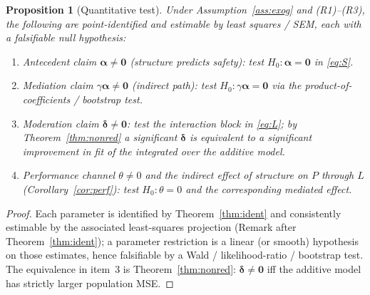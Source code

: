 \documentclass{amsart}
\theoremstyle{definition}
\theoremstyle{plain}
\newtheorem{proposition}{Proposition}
\begin{document}
\begin{proposition}[Quantitative test]\label{prop:quant}
Under Assumption~\ref{ass:exog} and (R1)--(R3), the following are point-identified and
estimable by least squares / SEM, each with a falsifiable null hypothesis:
\begin{enumerate}
\item \emph{Antecedent claim} $\bm\alpha\neq\bm0$ (structure predicts safety): test
$H_0:\bm\alpha=\bm0$ in \eqref{eq:S}.
\item \emph{Mediation claim} $\gamma\bm\alpha\neq\bm0$ (indirect path): test
$H_0:\gamma\bm\alpha=\bm0$ via the product-of-coefficients / bootstrap test.
\item \emph{Moderation claim} $\bm\delta\neq\bm0$: test the interaction block in
\eqref{eq:L}; by Theorem~\ref{thm:nonred} a significant $\bm\delta$ is equivalent to a
significant improvement in fit of the integrated over the additive model.
\item \emph{Performance channel} $\theta\neq0$ and the indirect effect of structure on $P$
through $L$ (Corollary~\ref{cor:perf}): test $H_0:\theta=0$ and the corresponding mediated
effect.
\end{enumerate}
\end{proposition}
\begin{proof}
Each parameter is identified by Theorem~\ref{thm:ident} and consistently estimable by the
associated least-squares projection (Remark after Theorem~\ref{thm:ident}); a parameter
restriction is a linear (or smooth) hypothesis on those estimates, hence falsifiable by a
Wald / likelihood-ratio / bootstrap test. The equivalence in item~3 is
Theorem~\ref{thm:nonred}: $\bm\delta\neq\bm0$ iff the additive model has strictly larger
population MSE.
\end{proof}
\end{document}
